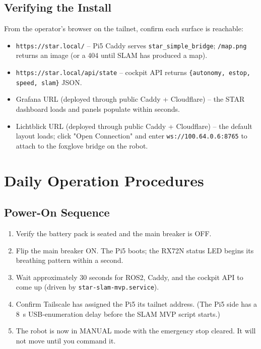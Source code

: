 \documentclass[11pt,letterpaper]{article}
\begin{document}
\subsection{Verifying the Install}
From the operator's browser on the tailnet, confirm each surface is
reachable:
\begin{itemize}[leftmargin=1.4em,itemsep=2pt]
\item \texttt{https://star.local/} -- Pi5 Caddy serves
      \texttt{star\_simple\_bridge}; \texttt{/map.png} returns an
      image (or a 404 until SLAM has produced a map).
\item \texttt{https://star.local/api/state} -- cockpit API returns
      \texttt{\{autonomy, estop, speed, slam\}} JSON.
\item Grafana URL (deployed through public Caddy + Cloudflare) --
      the STAR dashboard loads and panels populate within seconds.
\item Lichtblick URL (deployed through public Caddy + Cloudflare) --
      the default layout loads; click "Open Connection" and enter
      \texttt{ws://100.64.0.6:8765} to attach to the foxglove
      bridge on the robot.
\end{itemize}

\section{Daily Operation Procedures}
\label{sec:daily}

\subsection{Power-On Sequence}
\begin{enumerate}[leftmargin=1.4em,itemsep=2pt]
\item Verify the battery pack is seated and the main breaker is OFF.
\item Flip the main breaker ON. The Pi5 boots; the RX72N status LED
      begins its breathing pattern within a second.
\item Wait approximately 30 seconds for ROS2, Caddy, and the
      cockpit API to come up (driven by
      \texttt{star-slam-mvp.service}).
\item Confirm Tailscale has assigned the Pi5 its tailnet address.
      (The Pi5 side has a \qty{8}{\second} USB-enumeration delay
      before the SLAM MVP script starts.)
\item The robot is now in MANUAL mode with the emergency stop
      cleared. It will not move until you command it.
\end{enumerate}
\end{document}
